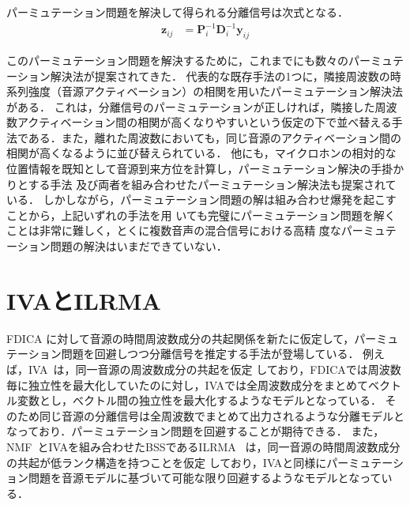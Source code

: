 パーミュテーション問題を解決して得られる分離信号は次式となる．
\begin{align}
\bm{z}_{ij} &= \bm{P}_{i}^{-1}\bm{D}_{i}^{-1}\bm{y}_{ij} \label{eq:z}
\end{align}

このパーミュテーション問題を解決するために，これまでにも数々のパーミュテーション解決法が提案されてきた．
代表的な既存手法の1つに，隣接周波数の時系列強度（音源アクティベーション）の相関を用いたパーミュテーション解決法\cite{COR}がある．
これは，分離信号のパーミュテーションが正しければ，隣接した周波数アクティベーション間の相関が高くなりやすいという仮定の下で並べ替える手法である．また，離れた周波数においても，同じ音源のアクティベーション間の相関が高くなるように並び替えられている．
他にも，マイクロホンの相対的な位置情報を既知として音源到来方位を計算し，パーミュテーション解決の手掛かりとする手法 \cite{DOA}及び両者を組み合わせたパーミュテーション解決法も提案されている．
しかしながら，パーミュテーション問題の解は組み合わせ爆発を起こすことから，上記いずれの手法を用
いても完璧にパーミュテーション問題を解くことは非常に難しく，とくに複数音声の混合信号における高精
度なパーミュテーション問題の解決はいまだできていない．

\section{IVAとILRMA}
\label{sec:ivailrma}



FDICA に対して音源の時間周波数成分の共起関係を新たに仮定して，パーミュテーション問題を回避しつつ分離信号を推定する手法が登場している．
例えば，IVA~\cite{IVA1,IVA2}は，同一音源の周波数成分の共起を仮定
しており，FDICAでは周波数毎に独立性を最大化していたのに対し，IVAでは全周波数成分をまとめてベクトル変数とし，べクトル間の独立性を最大化するようなモデルとなっている．
そのため同じ音源の分離信号は全周波数でまとめて出力されるような分離モデルとなっており．パーミュテーション問題を回避することが期待できる．
また，NMF~\cite{NMF}とIVAを組み合わせたBSSであるILRMA~\cite{ILRMA1,ILRMA2} は，同一音源の時間周波数成分の共起が低ランク構造を持つことを仮定
しており，IVAと同様にパーミュテーション問題を音源モデルに基づいて可能な限り回避するようなモデルとなっている．

